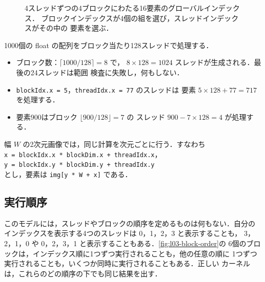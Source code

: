 \documentclass[../main.tex]{subfiles}
\begin{document}
\begin{figure}[tb]
  \centering
  
  \caption{4スレッドずつの4ブロックにわたる16要素のグローバルインデックス．
    ブロックインデックスが4個の組を選び，スレッドインデックスがその中の
    要素を選ぶ．}
  \label{fig:l03-global-index}
\end{figure}

\begin{example}[インデックスの計算]
  \label{ex:l03-index}
  1000個の float の配列をブロック当たり128スレッドで処理する．
  \begin{itemize}
    \item ブロック数：$\lceil 1000/128 \rceil = 8$ で，
      $8 \times 128 = 1024$ スレッドが生成される．最後の24スレッドは範囲
      検査に失敗し，何もしない．
    \item \texttt{blockIdx.x = 5}，\texttt{threadIdx.x = 77} のスレッドは
      要素 $5 \times 128 + 77 = 717$ を処理する．
    \item 要素900はブロック $\lfloor 900/128 \rfloor = 7$ の
      スレッド $900 - 7 \times 128 = 4$ が処理する．
  \end{itemize}
  幅 $W$ の2次元画像では，同じ計算を次元ごとに行う．すなわち\\ %
  \hspace*{1em}\texttt{x = blockIdx.x * blockDim.x + threadIdx.x}，\\
  \hspace*{1em}\texttt{y = blockIdx.y * blockDim.y + threadIdx.y}\\
  とし，要素は \texttt{img[y * W + x]} である．
\end{example}

\subsection{実行順序}

このモデルには，スレッドやブロックの順序を定めるものは何もない．自分の
インデックスを表示する4つのスレッドは 0，1，2，3 と表示することも，
3，2，1，0 や 0，2，3，1 と表示することもある．\cref{fig:l03-block-order}の
6個のブロックは，インデックス順に1つずつ実行されることも，他の任意の順に
1つずつ実行されることも，いくつか同時に実行されることもある．正しい
カーネルは，これらのどの順序の下でも同じ結果を出す．
\end{document}
